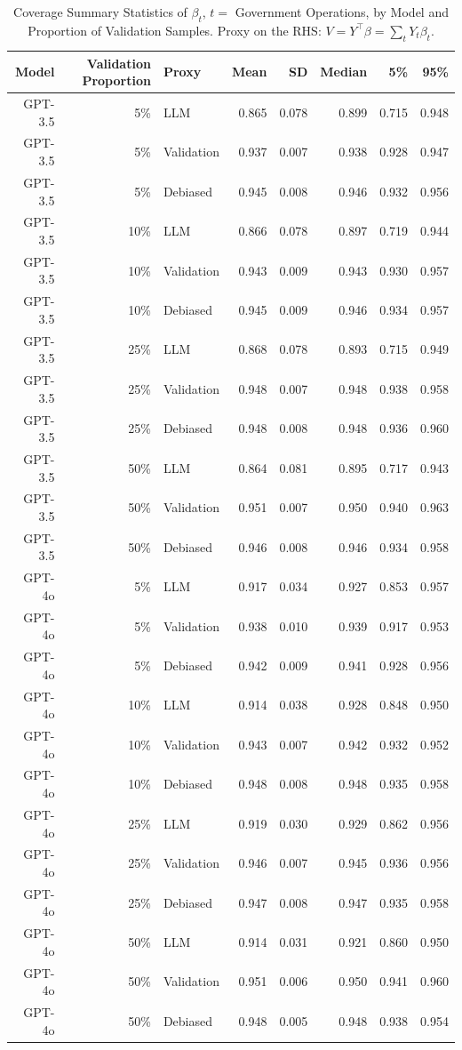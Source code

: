 \begin{table}

\caption{Coverage Summary Statistics of $\beta_{t}$, $t=$ Government Operations, by Model and Proportion of Validation Samples. Proxy on the RHS: $V = Y^\top \beta = \sum_{t} Y_t \beta_t$.}
\centering
\begin{tabular}[t]{rrlrrrrr}
\toprule
Model & Validation Proportion & Proxy & Mean & SD & Median & 5\% & 95\%\\
\midrule
GPT-3.5 & 5\% & LLM & 0.865 & 0.078 & 0.899 & 0.715 & 0.948\\
GPT-3.5 & 5\% & Validation & 0.937 & 0.007 & 0.938 & 0.928 & 0.947\\
GPT-3.5 & 5\% & Debiased & 0.945 & 0.008 & 0.946 & 0.932 & 0.956\\
GPT-3.5 & 10\% & LLM & 0.866 & 0.078 & 0.897 & 0.719 & 0.944\\
GPT-3.5 & 10\% & Validation & 0.943 & 0.009 & 0.943 & 0.930 & 0.957\\
GPT-3.5 & 10\% & Debiased & 0.945 & 0.009 & 0.946 & 0.934 & 0.957\\
GPT-3.5 & 25\% & LLM & 0.868 & 0.078 & 0.893 & 0.715 & 0.949\\
GPT-3.5 & 25\% & Validation & 0.948 & 0.007 & 0.948 & 0.938 & 0.958\\
GPT-3.5 & 25\% & Debiased & 0.948 & 0.008 & 0.948 & 0.936 & 0.960\\
GPT-3.5 & 50\% & LLM & 0.864 & 0.081 & 0.895 & 0.717 & 0.943\\
GPT-3.5 & 50\% & Validation & 0.951 & 0.007 & 0.950 & 0.940 & 0.963\\
GPT-3.5 & 50\% & Debiased & 0.946 & 0.008 & 0.946 & 0.934 & 0.958\\
GPT-4o & 5\% & LLM & 0.917 & 0.034 & 0.927 & 0.853 & 0.957\\
GPT-4o & 5\% & Validation & 0.938 & 0.010 & 0.939 & 0.917 & 0.953\\
GPT-4o & 5\% & Debiased & 0.942 & 0.009 & 0.941 & 0.928 & 0.956\\
GPT-4o & 10\% & LLM & 0.914 & 0.038 & 0.928 & 0.848 & 0.950\\
GPT-4o & 10\% & Validation & 0.943 & 0.007 & 0.942 & 0.932 & 0.952\\
GPT-4o & 10\% & Debiased & 0.948 & 0.008 & 0.948 & 0.935 & 0.958\\
GPT-4o & 25\% & LLM & 0.919 & 0.030 & 0.929 & 0.862 & 0.956\\
GPT-4o & 25\% & Validation & 0.946 & 0.007 & 0.945 & 0.936 & 0.956\\
GPT-4o & 25\% & Debiased & 0.947 & 0.008 & 0.947 & 0.935 & 0.958\\
GPT-4o & 50\% & LLM & 0.914 & 0.031 & 0.921 & 0.860 & 0.950\\
GPT-4o & 50\% & Validation & 0.951 & 0.006 & 0.950 & 0.941 & 0.960\\
GPT-4o & 50\% & Debiased & 0.948 & 0.005 & 0.948 & 0.938 & 0.954\\
\bottomrule
\end{tabular}
\end{table}
